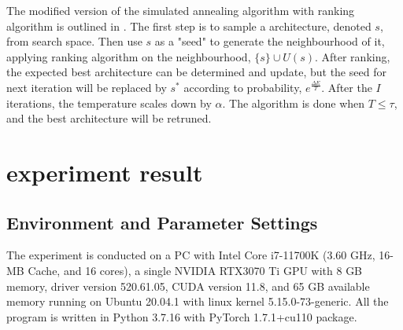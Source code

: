 \documentclass[sigconf]{acmart}
\begin{document}
    The modified version of the simulated annealing algorithm with ranking algorithm 
    is outlined in . The first step is to sample a architecture, denoted 
    $s$, from search space. Then use $s$ as a "seed" to generate the neighbourhood of it, 
    applying ranking algorithm on the neighbourhood, $\{s\}\cup U(s)$. After ranking, 
    the expected best architecture can be determined and update, but the seed for next 
    iteration will be replaced by $s^*$ according to probability, $e^{\frac{\Delta E}{T}}$.
    After the $I$ iterations, the temperature scales down by $\alpha$. The algorithm 
    is done when $T\leq\tau$, and the best architecture will be retruned. 


    \section{experiment result}
    \label{sec:results}
    \subsection{Environment and Parameter Settings}
    The experiment is conducted on a PC with Intel Core i7-11700K (3.60 GHz, 16-MB Cache, and 16 cores), 
    a single NVIDIA RTX3070 Ti GPU with 8 GB memory, driver version 520.61.05, CUDA version 11.8, and 
    65 GB available memory running on Ubuntu 20.04.1 with linux kernel 5.15.0-73-generic. All the program 
    is written in Python 3.7.16 with PyTorch 1.7.1+cu110 package. 
\end{document}

